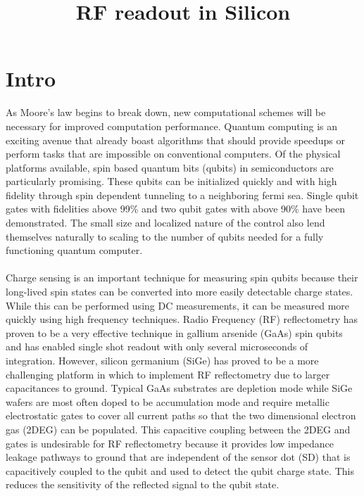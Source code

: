 \documentclass{article}
\title{RF readout in Silicon}
\begin{document}
\section{Intro} %
	\label{sec:intro}
	As Moore’s law begins to break down, new computational schemes will be necessary for improved computation performance.  Quantum computing is an exciting avenue that already boast algorithms that should provide speedups or perform tasks that are impossible on conventional computers.  Of the physical platforms available, spin based quantum bits (qubits) in semiconductors are particularly promising.  These qubits can be initialized quickly and with high fidelity through spin dependent tunneling to a neighboring fermi sea.  Single qubit gates with fidelities above 99\% and two qubit gates with above 90\% have been demonstrated.  The small size and localized nature of the control also lend themselves naturally to scaling to the number of qubits needed for a fully functioning quantum computer.   
	\\ \\
	Charge sensing is an important technique for measuring spin qubits because their long-lived spin states can be converted into more easily detectable charge states.  While this can be performed using DC measurements, it can be measured more quickly using high frequency techniques.  Radio Frequency (RF) reflectometry has proven to be a very effective technique in gallium arsenide (GaAs) spin qubits and has enabled single shot readout with only several microseconds of integration.  However, silicon germanium (SiGe) has proved to be a more challenging platform in which to implement RF reflectometry due to larger capacitances to ground.  Typical GaAs substrates are depletion mode while SiGe wafers are most often doped
	to be accumulation mode and require metallic electrostatic gates to cover all current paths so that the two dimensional electron gas (2DEG) can be populated.  This capacitive coupling between the 2DEG and gates is undesirable for RF reflectometry because it provides low impedance leakage pathways to ground that are independent of the sensor dot (SD) that is capacitively coupled to the qubit and used to detect the qubit charge state.  This reduces the sensitivity of the reflected signal to the qubit state.
\end{document}
